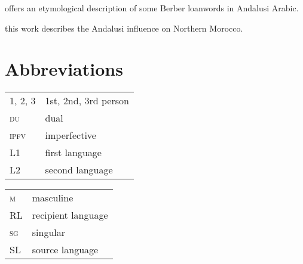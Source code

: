\documentclass[output=paper,modfonts,nonflat]{langsci/langscibook}
\begin{document}
\citep{Ferrando1997} offers an etymological description of some Berber loanwords in Andalusi Arabic. 

\citep{Vicente2010} this work describes the Andalusi influence on Northern Morocco. 

\section*{Abbreviations}

\begin{tabularx}{.45\textwidth}{lQ}
\textsc{1, 2, 3} & 1st, 2nd, 3rd person \\
\textsc{du} & dual \\
\textsc{ipfv} & imperfective \\
L1 & first language \\
L2 & second language \\
\end{tabularx}
\begin{tabularx}{.45\textwidth}{lQ}
\textsc{m} & masculine \\
RL & recipient language \\
\textsc{sg} & singular \\
SL & source language \\
\end{tabularx}
 
\sloppy\printbibliography[heading=subbibliography,notkeyword=this]
\end{document}
